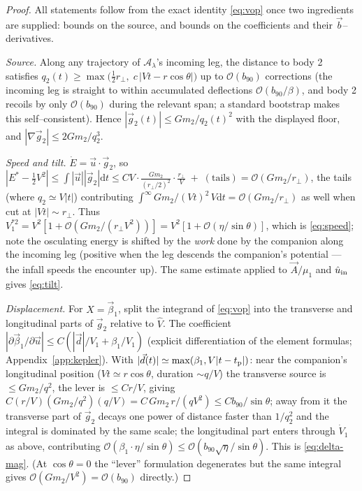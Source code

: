 \documentclass[11pt]{article}
\newcommand{\dd}{\mathrm{d}}
\newcommand{\rp}{r_\perp}
\newcommand{\bv}{\vec b}
\newcommand{\Vh}{\hat V}
\newcommand{\bnt}{b_{90}}
\newcommand{\order}[1]{\mathcal O\!\left(#1\right)}
\begin{document}
\begin{proof}
All statements follow from the exact identity \eqref{eq:vop} once two ingredients are supplied:
bounds on the source, and bounds on the coefficients and their $\bv$--derivatives.

\emph{Source.} Along any trajectory of $\mathcal A_\lambda$'s incoming leg, the distance to body 2
satisfies $q_2(t)\ge\max\big(\tfrac12\rp,\;c\,|V t-r\cos\theta|\big)$ up to $\order{\bnt}$
corrections (the incoming leg is straight to within accumulated deflections $\order{\bnt/\beta}$,
and body 2 recoils by only $\order{\bnt}$ during the relevant span; a standard bootstrap makes this
self--consistent). Hence $|\vec g_2(t)|\le Gm_2/q_2(t)^2$ with the displayed floor, and
$|\nabla\vec g_2|\le 2Gm_2/q_2^3$.

\emph{Speed and tilt.} $\dot E=\vec u\cdot\vec g_2$, so
$|E^*-\tfrac12V^2|\le\int|\vec u||\vec g_2|\dd t
\le CV\cdot\frac{Gm_2}{(\rp/2)^2}\cdot\frac{\rp}{V}\;+\;(\text{tails})
= \order{Gm_2/\rp}$, the tails (where $q_2\simeq V|t|$) contributing
$\int^\infty Gm_2/(Vt)^2\,V\dd t=\order{Gm_2/\rp}$ as well when cut at $|Vt|\sim\rp$. Thus
$V_1^{*2}=V^2[1+\order{Gm_2/(\rp V^2)}]=V^2[1+\order{\eta/\sin\theta}]$, which is \eqref{eq:speed};
note the osculating energy is shifted by the \emph{work} done by the companion along the incoming
leg (positive when the leg descends the companion's potential --- the infall speeds the encounter
up). The same estimate applied to $\vec A/\mu_1$ and $\hat u_{\rm in}$ gives \eqref{eq:tilt}.

\emph{Displacement.} For $X=\vec\beta_1$, split the integrand of \eqref{eq:vop} into the transverse
and longitudinal parts of $\vec g_2$ relative to $\Vh$. The coefficient
$|\partial\vec\beta_1/\partial\vec u|\le C(|\vec d|/V_1+\beta_1/V_1)$ (explicit differentiation of
the element formulas; Appendix~\ref{app:kepler}). With $|\vec d(t)|\simeq\max(\beta_1,V|t-t_{\rm p}|)$:
near the companion's longitudinal position ($Vt\simeq r\cos\theta$, duration $\sim q/V$) the
transverse source is $\le Gm_2/q^2$, the lever is $\le C r/V$, giving
$C(r/V)(Gm_2/q^2)(q/V)=C\,Gm_2\,r/(qV^2)\le C\bnt/\sin\theta$; away from it the transverse part of
$\vec g_2$ decays one power of distance faster than $1/q_2^2$ and the integral is dominated by the
same scale; the longitudinal part enters through $\dot V_1$ as above, contributing
$\order{\beta_1\cdot\eta/\sin\theta}\le\order{\bnt\sqrt\eta/\sin\theta}$. This is
\eqref{eq:delta-mag}. (At $\cos\theta=0$ the ``lever'' formulation degenerates but the same integral
gives $\order{Gm_2/V^2}=\order\bnt$ directly.)


\end{proof}
\end{document}
